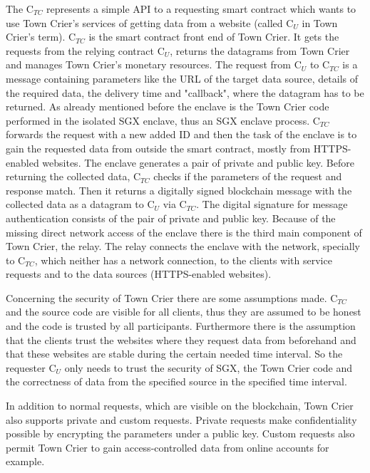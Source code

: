 \documentclass[conference]{IEEEtran}
\begin{document}
The C$_{TC}$ represents a simple API to a requesting smart contract which wants to use Town Crier's services of getting data from a website (called C$_{U}$ in Town Crier's term). C$_{TC}$ is the smart contract front end of Town Crier. It gets the requests from the relying contract C$_{U}$, returns the datagrams from Town Crier and manages Town Crier's monetary resources. The request from C$_{U}$ to C$_{TC}$ is a message containing parameters like the URL of the target data source, details of the required data, the delivery time and "callback", where the datagram has to be returned. As already mentioned before the enclave is the Town Crier code performed in the isolated SGX enclave, thus an SGX enclave process. C$_{TC}$ forwards the request with a new added ID and then the task of the enclave is to gain the requested data from outside the smart contract, mostly from HTTPS-enabled websites. The enclave generates a pair of private and public key. Before returning the collected data, C$_{TC}$ checks if the parameters of the request and response match. Then it returns a digitally signed blockchain message with the collected data as a datagram to C$_{U}$ via C$_{TC}$. The digital signature for message authentication consists of the pair of private and public key. Because of the missing direct network access of the enclave there is the third main component of Town Crier, the relay. The relay connects the enclave with the network, specially to C$_{TC}$, which neither has a network connection, to the clients with service requests and to the data sources (HTTPS-enabled websites). \cite{Zhang2016} \par 
Concerning the security of Town Crier there are some assumptions made. C$_{TC}$ and the source code are visible for all clients, thus they are assumed to be honest and the code is trusted by all participants. Furthermore there is the assumption that the clients trust the websites where they request data from beforehand and that these websites are stable during the certain needed time interval. So the requester C$_{U}$ only needs to trust the security of SGX, the Town Crier code and the correctness of data from the specified source in the specified time interval. \cite{Zhang2016} \par 
In addition to normal requests, which are visible on the blockchain, Town Crier also supports private and custom requests. Private requests make confidentiality possible by encrypting the parameters under a public key. Custom requests also permit Town Crier to gain access-controlled data from online accounts for example. \cite{Zhang2016} \par 
\end{document}
